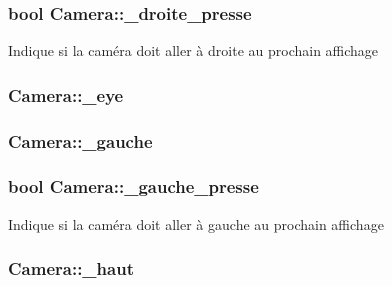 \hypertarget{class_camera_a61b2e438537b99ba1f0a97e5586b7f45}{
\subsubsection[{\+\_\+droite\+\_\+presse}]{\setlength{\rightskip}{0pt plus 5cm}bool Camera\+::\+\_\+droite\+\_\+presse}}\label{class_camera_a61b2e438537b99ba1f0a97e5586b7f45}
Indique si la caméra doit aller à droite au prochain affichage \hypertarget{class_camera_ad4c22c27bd247f4411c4166220ba6e82}{
\subsubsection[{\+\_\+eye}]{ Camera\+::\+\_\+eye\hspace{0.3cm}{\ttfamily [protected]}}}\label{class_camera_ad4c22c27bd247f4411c4166220ba6e82}
\hypertarget{class_camera_aaf97dba7663b99065d8d508b589224de}{
\subsubsection[{\+\_\+gauche}]{ Camera\+::\+\_\+gauche\hspace{0.3cm}{\ttfamily [protected]}}}\label{class_camera_aaf97dba7663b99065d8d508b589224de}
\hypertarget{class_camera_ac2a5c37c4f9603a14e3616d6a75f7998}{
\subsubsection[{\+\_\+gauche\+\_\+presse}]{\setlength{\rightskip}{0pt plus 5cm}bool Camera\+::\+\_\+gauche\+\_\+presse}}\label{class_camera_ac2a5c37c4f9603a14e3616d6a75f7998}
Indique si la caméra doit aller à gauche au prochain affichage \hypertarget{class_camera_af860db197a7abbf0284df4e32a95a347}{
\subsubsection[{\+\_\+haut}]{ Camera\+::\+\_\+haut\hspace{0.3cm}{\ttfamily [protected]}}}\label{class_camera_af860db197a7abbf0284df4e32a95a347}
